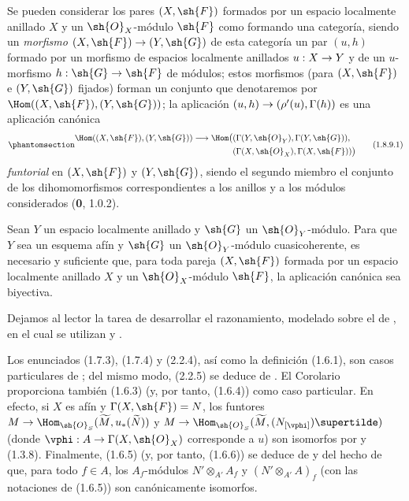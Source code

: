 \documentclass[oneside,10pt]{amsart}
\makeatletter
\newcommand{\ega@arrow}[2]{\mathchoice{#1}{#2}{#2}{#2}}
\renewcommand{\to}{\ega@arrow{\longrightarrow}{\rightarrow}}
\newcommand{\oldpage}[2][]{\marginnote{\normalfont\footnotesize\textbf{#1}~|~#2}\ignorespaces}
\let\EGAOriginalLabel\label
\renewcommand{\label}[1]{\phantomsection\EGAOriginalLabel{#1}}
\makeatother
\begin{document}
\begin{env}[1.8.9]
\label{ega2:addendum:I.1.8.9-fr}
Se pueden considerar los pares $(X,\sh{F})$ formados por un espacio localmente anillado $X$ y un $\sh{O}_X$-módulo $\sh{F}$ como formando una categoría, siendo un \emph{morfismo} $(X,\sh{F})\to(Y,\sh{G})$ de esta categoría un par $(u,h)$ formado por un morfismo de
\oldpage[II]{221}
espacios localmente anillados $u:X\to Y$ y de un $u$-morfismo
$h:\sh{G}\to\sh{F}$ de módulos; estos
morfismos (para $(X,\sh{F})$ e $(Y,\sh{G})$ fijados) forman un conjunto
que denotaremos por $\Hom((X,\sh{F}),(Y,\sh{G}))$; la aplicación
$(u,h)\to(\rho'(u),\Gamma(h))$ es una aplicación canónica
\begin{equation}
\label{ega2:addendum:I.1.8.9.1-fr}
\begin{split}
  \Hom((X,\sh{F}),(Y,\sh{G}))\to
  \Hom\bigl(
    &(\Gamma(Y,\sh{O}_Y),\Gamma(Y,\sh{G})),\\
    &(\Gamma(X,\sh{O}_X),\Gamma(X,\sh{F}))
  \bigr)
\end{split}
\tag{1.8.9.1}
\end{equation}
\emph{funtorial} en $(X,\sh{F})$ y $(Y,\sh{G})$, siendo el segundo miembro
el conjunto de los dihomomorfismos correspondientes a los anillos y a
los módulos considerados (\textbf 0, 1.0.2).
\end{env}

\begin{corollary}[1.8.10]
\label{ega2:addendum:I.1.8.10-fr}
Sean $Y$ un espacio localmente anillado y $\sh{G}$ un
$\sh{O}_Y$-módulo. Para que $Y$ sea un esquema afín y $\sh{G}$ un
$\sh{O}_Y$-módulo cuasicoherente, es necesario y suficiente que, para
toda pareja $(X,\sh{F})$ formada por un espacio localmente anillado $X$
y un $\sh{O}_X$-módulo $\sh{F}$, la aplicación canónica
 sea biyectiva.
\end{corollary}

Dejamos al lector la tarea de desarrollar el razonamiento, modelado
sobre el de , en el cual se utilizan  y
.

\begin{remark}[1.8.11]
\label{ega2:addendum:I.1.8.11-fr}
Los enunciados (1.7.3), (1.7.4) y (2.2.4), así como la
definición (1.6.1), son casos particulares de ; del
mismo modo, (2.2.5) se deduce de . El
Corolario~ proporciona también (1.6.3) (y, por tanto,
(1.6.4)) como caso particular. En efecto, si $X$ es afín y
$\Gamma(X,\sh{F})=N$, los funtores
$M\to
  \Hom_{\sh{O}_S}(\widetilde M,u_*(\widetilde N))$ y $M\to
  \Hom_{\sh{O}_S}(\widetilde M,(N_{[\vphi]})\supertilde)$
(donde $\vphi:A\to\Gamma(X,\sh{O}_X)$ corresponde a $u$) son
isomorfos por  y (1.3.8). Finalmente, (1.6.5) (y,
por tanto, (1.6.6)) se deduce de  y del hecho de que,
para todo $f\in A$, los $A_f$-módulos
$N'\otimes_{A'}A_f$ y $(N'\otimes_{A'}A)_f$
(con las notaciones de (1.6.5)) son canónicamente isomorfos.
\end{remark}
\end{document}
